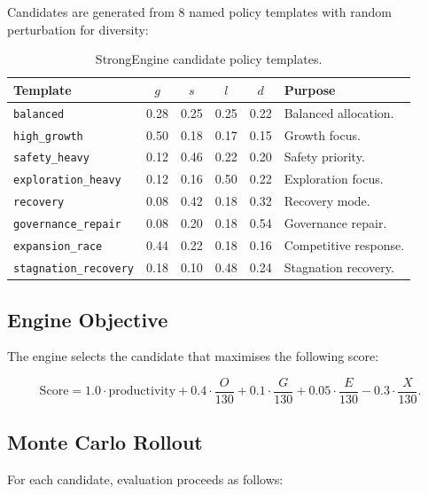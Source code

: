 Candidates are generated from 8 named policy templates with random
perturbation for diversity:

\begin{table}[ht]
\centering
\small
\begin{tabular}{lccccl}
\toprule
\textbf{Template} & $g$ & $s$ & $l$ & $d$ & \textbf{Purpose} \\
\midrule
\texttt{balanced} & 0.28 & 0.25 & 0.25 & 0.22 & Balanced
allocation. \\
\texttt{high\_growth} & 0.50 & 0.18 & 0.17 & 0.15 & Growth focus. \\
\texttt{safety\_heavy} & 0.12 & 0.46 & 0.22 & 0.20 & Safety
priority. \\
\texttt{exploration\_heavy} & 0.12 & 0.16 & 0.50 & 0.22 &
Exploration focus. \\
\texttt{recovery} & 0.08 & 0.42 & 0.18 & 0.32 & Recovery mode. \\
\texttt{governance\_repair} & 0.08 & 0.20 & 0.18 & 0.54 & Governance
repair. \\
\texttt{expansion\_race} & 0.44 & 0.22 & 0.18 & 0.16 & Competitive
response. \\
\texttt{stagnation\_recovery} & 0.18 & 0.10 & 0.48 & 0.24 &
Stagnation recovery. \\
\bottomrule
\end{tabular}
\caption[StrongEngine candidate templates]{StrongEngine candidate
policy templates.}
\label{tab:vnext-candidate-templates}
\end{table}

\subsection{Engine Objective}
\label{sec:vnext-engine-objective}

The engine selects the candidate that maximises the following score:

\begin{equation}
\mathrm{Score} = 1.0 \cdot \mathrm{productivity}
+ 0.4 \cdot \frac{O}{130}
+ 0.1 \cdot \frac{G}{130}
+ 0.05 \cdot \frac{E}{130}
- 0.3 \cdot \frac{X}{130}.
\label{eq:vnext-engine-score}
\end{equation}

\subsection{Monte Carlo Rollout}
\label{sec:vnext-mc-rollout}

For each candidate, evaluation proceeds as follows:

